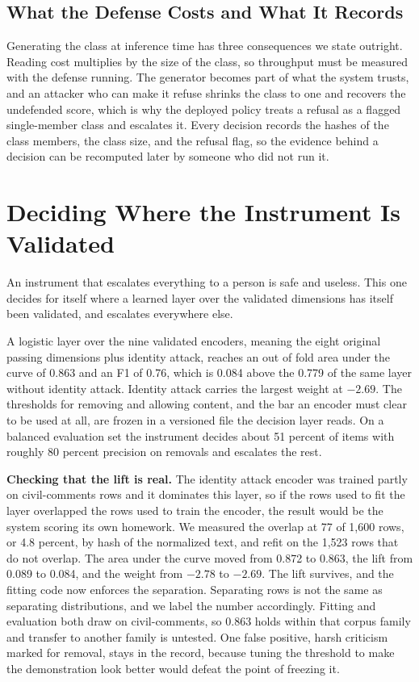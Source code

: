 \documentclass[journal]{IEEEtran}
\begin{document}
\subsection{What the Defense Costs and What It Records}
\label{sec:trust}

Generating the class at inference time has three consequences we state
outright. Reading cost multiplies by the size of the class, so throughput
must be measured with the defense running. The generator becomes part of what
the system trusts, and an attacker who can make it refuse shrinks the class
to one and recovers the undefended score, which is why the deployed policy
treats a refusal as a flagged single-member class and escalates it. Every
decision records the hashes of the class members, the class size, and the
refusal flag, so the evidence behind a decision can be recomputed later by
someone who did not run it.

\section{Deciding Where the Instrument Is Validated}
\label{sec:contraction}

An instrument that escalates everything to a person is safe and useless. This
one decides for itself where a learned layer over the validated dimensions
has itself been validated, and escalates everywhere else.

A logistic layer over the nine validated encoders, meaning the eight original
passing dimensions plus identity attack, reaches an out of fold area under
the curve of 0.863 and an F1 of 0.76, which is 0.084 above the 0.779 of the
same layer without identity attack. Identity attack carries the largest
weight at $-2.69$. The thresholds for removing and allowing content, and the
bar an encoder must clear to be used at all, are frozen in a versioned file
the decision layer reads. On a balanced evaluation set the instrument decides
about 51 percent of items with roughly 80 percent precision on removals and
escalates the rest.

\textbf{Checking that the lift is real.} The identity attack encoder was
trained partly on civil-comments rows and it dominates this layer, so if the
rows used to fit the layer overlapped the rows used to train the encoder, the
result would be the system scoring its own homework. We measured the overlap
at 77 of 1,600 rows, or 4.8 percent, by hash of the normalized text, and
refit on the 1,523 rows that do not overlap. The area under the curve moved
from 0.872 to 0.863, the lift from 0.089 to 0.084, and the weight from
$-2.78$ to $-2.69$. The lift survives, and the fitting code now enforces the
separation. Separating rows is not the same as separating distributions, and
we label the number accordingly. Fitting and evaluation both draw on
civil-comments, so 0.863 holds within that corpus family and transfer to
another family is untested. One false positive, harsh criticism marked for
removal, stays in the record, because tuning the threshold to make the
demonstration look better would defeat the point of freezing it.
\end{document}
